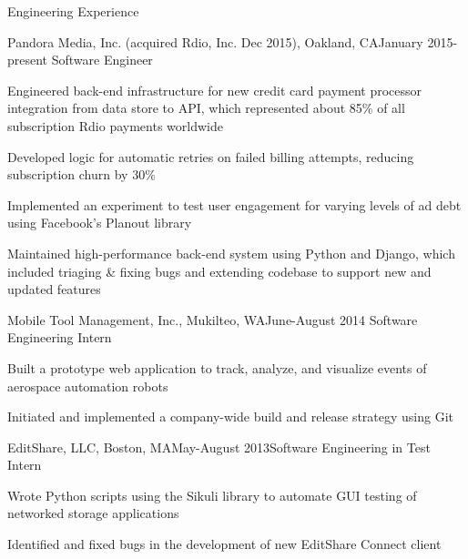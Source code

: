 \documentclass{resume} %
\begin{document}

\begin{rSection}{Engineering Experience}

\begin{rSubsection}{Pandora Media, Inc. (acquired Rdio, Inc. Dec 2015), Oakland, CA}{January 2015-present} {Software Engineer}

\item Engineered back-end infrastructure for new credit card payment processor integration from data store to API, which represented about 85\% of all subscription Rdio payments worldwide
\item Developed logic for automatic retries on failed billing attempts, reducing subscription churn by 30\%
\item Implemented an experiment to test user engagement for varying levels of ad debt using Facebook's Planout library
\item Maintained high-performance back-end system using Python and Django, which included triaging \& fixing bugs and extending codebase to support new and updated features
\end{rSubsection}

\begin{rSubsection}{Mobile Tool Management, Inc., Mukilteo, WA}{June-August 2014} {Software Engineering Intern}

\item Built a prototype web application to track, analyze, and visualize events of aerospace automation robots
\item Initiated and implemented a company-wide build and release strategy using Git
\end{rSubsection}


\begin{rSubsection}{EditShare, LLC, Boston, MA}{May-August 2013}{Software Engineering in Test Intern}{}
\item Wrote Python scripts using the Sikuli library to automate GUI testing of networked storage applications
\item Identified and fixed bugs in the development of new EditShare Connect client
\end{rSubsection}

\end{rSection}
\end{document}
